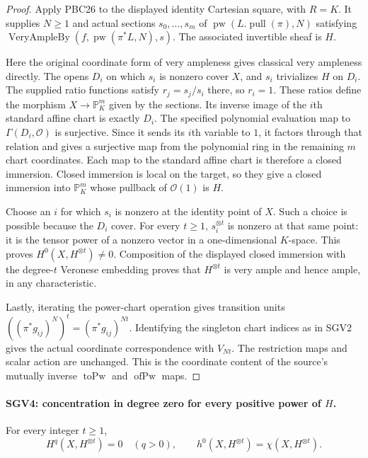 \documentclass[11pt,a4paper]{article}
\numberwithin{equation}{section}
\theoremstyle{remark}\newtheorem{remark}[theorem]{Remark}
\begin{document}
\begin{proof}
Apply PBC26 to the displayed identity Cartesian square, with $R=K$.
It supplies $N\ge1$ and actual sections $s_0,\ldots,s_m$ of
$\operatorname{pw}(L.\operatorname{pull}(\pi),N)$ satisfying
$\operatorname{VeryAmpleBy}(f,\operatorname{pw}(\pi^*L,N),s)$.
The associated invertible sheaf is $H$.

Here the original coordinate form of very ampleness gives classical
very ampleness directly.  The opens $D_i$ on which $s_i$ is nonzero
cover $X$, and $s_i$ trivializes $H$ on $D_i$.  The supplied ratio
functions satisfy $r_j=s_j/s_i$ there, so $r_i=1$.
These ratios define the morphism $X\to\mathbb P^m_K$ given by the
sections.  Its inverse image of the $i$th standard affine chart is
exactly $D_i$.  The specified polynomial evaluation map to
$\Gamma(D_i,\mathcal O)$ is surjective.  Since it sends its $i$th
variable to $1$, it factors through that relation and gives a
surjective map from the polynomial ring in the remaining $m$ chart
coordinates.  Each map to the standard affine chart is therefore a
closed immersion.  Closed immersion is local on the target, so they
give a closed immersion into $\mathbb P^m_K$ whose pullback of
$\mathcal O(1)$ is $H$.

Choose an $i$ for which $s_i$ is nonzero at the identity point of $X$.
Such a choice is possible because the $D_i$ cover.  For every $t\ge1$,
$s_i^{\otimes t}$ is nonzero at that same point: it is the tensor
power of a nonzero vector in a one-dimensional $K$-space.
This proves $H^0(X,H^{\otimes t})\ne0$.  Composition of the displayed
closed immersion with the degree-$t$ Veronese embedding proves that
$H^{\otimes t}$ is very ample and hence ample, in any characteristic.

Lastly, iterating the power-chart operation gives transition units
$((\pi^*g_{ij})^N)^t=(\pi^*g_{ij})^{Nt}$.  Identifying the singleton
chart indices as in SGV2 gives the actual coordinate correspondence
with $V_{Nt}$.  The restriction maps and scalar action are unchanged.
This is the coordinate content of the source's mutually inverse
$\operatorname{toPw}$ and $\operatorname{ofPw}$ maps.
\end{proof}

\paragraph{SGV4: concentration in degree zero for every positive power of \(H\).}
\label{claim:SGV4}
For every integer $t\ge1$,
\[
 H^q(X,H^{\otimes t})=0\quad(q>0),\qquad
 h^0(X,H^{\otimes t})=\chi(X,H^{\otimes t}).
                                                        \tag{SGV.4}
\]
\end{document}
